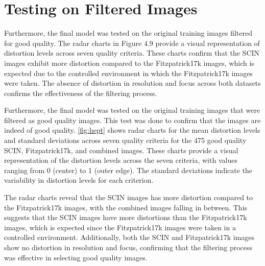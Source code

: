 \section{Testing on Filtered Images}
\label{sec:TestingFilteredImages}
Furthermore, the final model was tested on the original training images filtered for good quality. The radar charts in Figure 4.9 provide a visual representation of distortion levels across seven quality criteria. These charts confirm that the SCIN images exhibit more distortion compared to the Fitzpatrick17k images, which is expected due to the controlled environment in which the Fitzpatrick17k images were taken. The absence of distortion in resolution and focus across both datasets confirms the effectiveness of the filtering process. \par
\vspace{\baselineskip}
\noindent
Furthermore, the final model was tested on the original training images that were filtered as good quality images. This test was done to confirm that the images are indeed of good quality. \autoref{fig:hept} shows radar charts for the mean distortion levels and standard deviations across seven quality criteria for the 475 good quality SCIN, Fitzpatrick17k, and combined images. These charts provide a visual representation of the distortion levels across the seven criteria, with values ranging from 0 (center) to 1 (outer edge). The standard deviations indicate the variability in distortion levels for each criterion. \par
\vspace{\baselineskip}
\noindent
The radar charts reveal that the SCIN images has more distortion compared to the Fitzpatrick17k images, with the combined images falling in between. This suggests that the SCIN images have more distortions than the Fitzpatrick17k images, which is expected since the Fitzpatrick17k images were taken in a controlled environment. Additionally, both the SCIN and Fitzpatrick17k images show no distortion in resolution and focus, confirming that the filtering process was effective in selecting good quality images. \par
